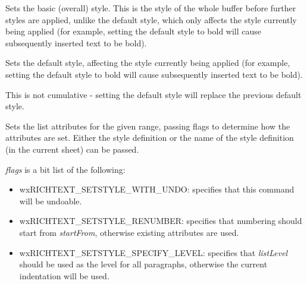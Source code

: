 \label{wxrichtextbuffersetbasicstyle}



Sets the basic (overall) style. This is the style of the whole
buffer before further styles are applied, unlike the default style, which
only affects the style currently being applied (for example, setting the default
style to bold will cause subsequently inserted text to be bold).

\label{wxrichtextbuffersetdefaultstyle}


Sets the default style, affecting the style currently being applied (for example, setting the default
style to bold will cause subsequently inserted text to be bold).

This is not cumulative - setting the default style will replace the previous default style.

\label{wxrichtextbuffersetliststyle}



Sets the list attributes for the given range, passing flags to determine how the attributes are set.
Either the style definition or the name of the style definition (in the current sheet) can be passed.

{\it flags} is a bit list of the following:

\begin{itemize}\itemsep=0pt
\item wxRICHTEXT\_SETSTYLE\_WITH\_UNDO: specifies that this command will be undoable.
\item wxRICHTEXT\_SETSTYLE\_RENUMBER: specifies that numbering should start from {\it startFrom}, otherwise existing attributes are used.
\item wxRICHTEXT\_SETSTYLE\_SPECIFY\_LEVEL: specifies that {\it listLevel} should be used as the level for all paragraphs, otherwise the current indentation will be used.
\end{itemize}

